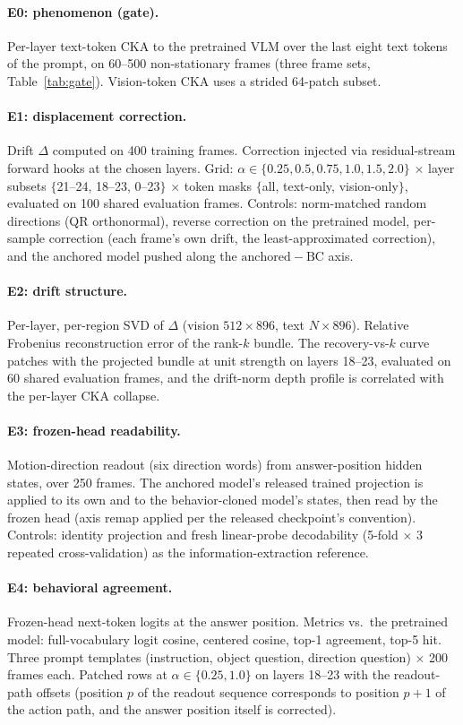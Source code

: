 \documentclass{article}
\begin{document}
\paragraph{E0: phenomenon (gate).} Per-layer text-token CKA to the pretrained VLM over the
last eight text tokens of the prompt, on 60--500 non-stationary frames (three frame sets,
Table~\ref{tab:gate}). Vision-token CKA uses a strided 64-patch subset.

\paragraph{E1: displacement correction.} Drift $\Delta$ computed on 400 training frames.
Correction injected via residual-stream forward hooks at the chosen
layers. Grid: $\alpha \in \{0.25,0.5,0.75,1.0,1.5,2.0\}$ $\times$ layer subsets
$\{$21--24, 18--23, 0--23$\}$ $\times$ token masks $\{$all, text-only, vision-only$\}$,
evaluated on 100 shared evaluation frames. Controls: norm-matched random directions (QR
orthonormal), reverse correction on the pretrained model, per-sample correction (each frame's
own drift, the least-approximated correction), and the anchored model pushed along the
$\mathrm{anchored}{-}\mathrm{BC}$ axis.

\paragraph{E2: drift structure.} Per-layer, per-region SVD of $\Delta$ (vision
$512\times 896$, text $N\times 896$). Relative Frobenius reconstruction error of the rank-$k$
bundle. The recovery-vs-$k$ curve patches with the projected bundle at unit strength on
layers 18--23, evaluated on 60 shared evaluation frames, and the drift-norm depth profile is correlated with the
per-layer CKA collapse.

\paragraph{E3: frozen-head readability.} Motion-direction readout (six direction words)
from answer-position hidden states, over 250 frames. The anchored model's released trained
projection is applied
to its own and to the behavior-cloned model's states, then read by the frozen head (axis
remap applied per the released checkpoint's convention). Controls: identity projection and
fresh linear-probe decodability (5-fold $\times$ 3 repeated cross-validation) as the
information-extraction reference.

\paragraph{E4: behavioral agreement.} Frozen-head next-token logits at the answer
position. Metrics vs.\ the pretrained model: full-vocabulary logit cosine, centered cosine,
top-1 agreement, top-5 hit. Three prompt templates (instruction, object question, direction
question) $\times$ 200 frames each. Patched rows at $\alpha \in \{0.25, 1.0\}$ on layers
18--23 with the readout-path offsets (position $p$ of the readout sequence corresponds to
position $p{+}1$ of the action path, and the answer position itself is corrected).
\end{document}

